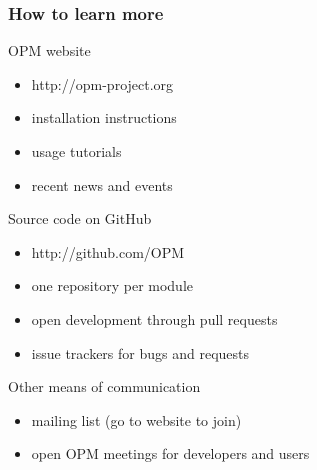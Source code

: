 \documentclass[UKenglish,10pt]{beamer}
\begin{document}
\begin{frame}
  \frametitle{How to learn more}
  \begin{block}{OPM website}
    \begin{itemize}
    \item http://opm-project.org
    \item installation instructions 
    \item usage tutorials
    \item recent news and events
    \end{itemize}
  \end{block}
  \begin{block}{Source code on GitHub}
    \begin{itemize}
    \item http://github.com/OPM
    \item one repository per module
    \item open development through pull requests
    \item issue trackers for bugs and requests
    \end{itemize}
  \end{block}
  \begin{block}{Other means of communication}
    \begin{itemize}
    \item mailing list (go to website to join)
    \item open OPM meetings for developers and users
    \end{itemize}
  \end{block}
\end{frame}
\end{document}
